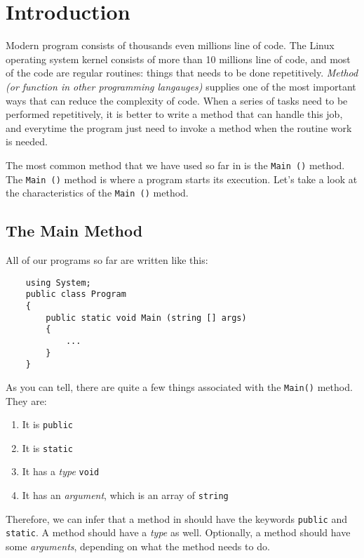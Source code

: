 \documentclass[../main.tex]{subfiles}
\begin{document}
    \section {Introduction}
    Modern program consists of thousands even millions line of code. The Linux
    operating system kernel consists of more than 10 millions line of code, and
    most of the code are regular routines: things that needs to be done repetitively.
    \emph{Method (or function in other programming langauges)} supplies one of
    the most important ways that can reduce the complexity of code. When a series
    of tasks need to be performed repetitively, it is better to write a method
    that can handle this job, and everytime the program just need to invoke a
    method when the routine work is needed.

    The most common method that we have used so far in \csharp is the
    \texttt{Main ()} method. The \texttt{Main ()} method is where a program starts
    its execution. Let's take a look at the characteristics of the \texttt{Main ()}
    method.

    \subsection{The Main Method}
    All of our programs so far are written like this:
    \begin{verbatim}
    using System;
    public class Program
    {
        public static void Main (string [] args)
        {
            ...
        }
    }
    \end{verbatim}

    As you can tell, there are quite a few things associated with the \texttt{Main()}
    method. They are:
    \begin{enumerate}
        \item It is \texttt{public}
        \item It is \texttt{static}
        \item It has a \emph{type} \texttt{void}
        \item It has an \emph{argument}, which is an array of \texttt{string}
    \end{enumerate}

    Therefore, we can infer that a method in \csharp should have the keywords
    \texttt{public} and \texttt{static}. A method should have a \emph{type} as
    well. Optionally, a method should have some \emph{argument{s}}, depending on
    what the method needs to do.
\end{document}
